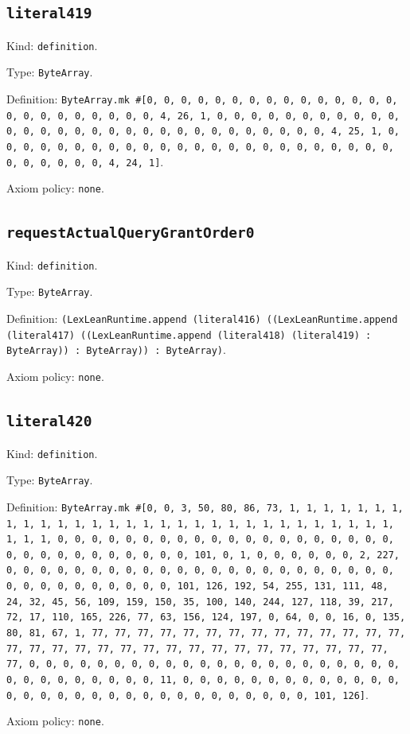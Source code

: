 \documentclass[11pt]{article}
\begin{document}
\subsection*{\texttt{literal419}}
\noindent Kind: \texttt{definition}.\par
\noindent Type: \texttt{ByteArray}.\par
\noindent Definition: \texttt{ByteArray.mk \#[0, 0, 0, 0, 0, 0, 0, 0, 0, 0, 0, 0, 0, 0, 0, 0, 0, 0, 0, 0, 0, 0, 0, 0, 4, 26, 1, 0, 0, 0, 0, 0, 0, 0, 0, 0, 0, 0, 0, 0, 0, 0, 0, 0, 0, 0, 0, 0, 0, 0, 0, 0, 0, 0, 0, 0, 0, 4, 25, 1, 0, 0, 0, 0, 0, 0, 0, 0, 0, 0, 0, 0, 0, 0, 0, 0, 0, 0, 0, 0, 0, 0, 0, 0, 0, 0, 0, 0, 0, 0, 4, 24, 1]}.\par
\noindent Axiom policy: \texttt{none}.\par
\subsection*{\texttt{requestActualQueryGrantOrder0}}
\noindent Kind: \texttt{definition}.\par
\noindent Type: \texttt{ByteArray}.\par
\noindent Definition: \texttt{(LexLeanRuntime.append (literal416) ((LexLeanRuntime.append (literal417) ((LexLeanRuntime.append (literal418) (literal419) : ByteArray)) : ByteArray)) : ByteArray)}.\par
\noindent Axiom policy: \texttt{none}.\par
\subsection*{\texttt{literal420}}
\noindent Kind: \texttt{definition}.\par
\noindent Type: \texttt{ByteArray}.\par
\noindent Definition: \texttt{ByteArray.mk \#[0, 0, 3, 50, 80, 86, 73, 1, 1, 1, 1, 1, 1, 1, 1, 1, 1, 1, 1, 1, 1, 1, 1, 1, 1, 1, 1, 1, 1, 1, 1, 1, 1, 1, 1, 1, 1, 1, 1, 1, 0, 0, 0, 0, 0, 0, 0, 0, 0, 0, 0, 0, 0, 0, 0, 0, 0, 0, 0, 0, 0, 0, 0, 0, 0, 0, 0, 0, 0, 0, 0, 101, 0, 1, 0, 0, 0, 0, 0, 0, 2, 227, 0, 0, 0, 0, 0, 0, 0, 0, 0, 0, 0, 0, 0, 0, 0, 0, 0, 0, 0, 0, 0, 0, 0, 0, 0, 0, 0, 0, 0, 0, 0, 0, 0, 101, 126, 192, 54, 255, 131, 111, 48, 24, 32, 45, 56, 109, 159, 150, 35, 100, 140, 244, 127, 118, 39, 217, 72, 17, 110, 165, 226, 77, 63, 156, 124, 197, 0, 64, 0, 0, 16, 0, 135, 80, 81, 67, 1, 77, 77, 77, 77, 77, 77, 77, 77, 77, 77, 77, 77, 77, 77, 77, 77, 77, 77, 77, 77, 77, 77, 77, 77, 77, 77, 77, 77, 77, 77, 77, 77, 0, 0, 0, 0, 0, 0, 0, 0, 0, 0, 0, 0, 0, 0, 0, 0, 0, 0, 0, 0, 0, 0, 0, 0, 0, 0, 0, 0, 0, 0, 0, 11, 0, 0, 0, 0, 0, 0, 0, 0, 0, 0, 0, 0, 0, 0, 0, 0, 0, 0, 0, 0, 0, 0, 0, 0, 0, 0, 0, 0, 0, 0, 0, 101, 126]}.\par
\noindent Axiom policy: \texttt{none}.\par
\end{document}
